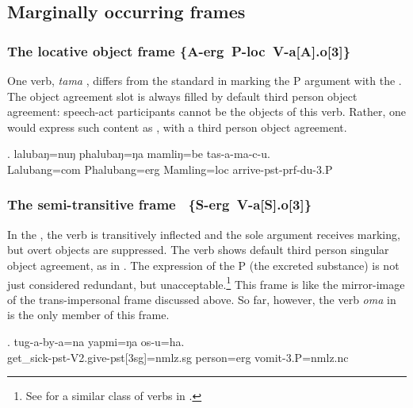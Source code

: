 \subsection{Marginally occurring frames}\label{tr-marg}
\subsubsection[The locative object frame]{The locative object frame %
\mbox{\{A-{\sc erg} P-{\sc loc} V-a[A].o[3]\}}}
\label{tr-loc}


\noindent
One verb,  \emph{tama} , differs from the standard  in  marking the P argument with the  .  The object agreement slot is always filled by default third person object agreement: speech-act participants cannot be the objects of this verb. Rather, one would express  such content as , with a third person object agreement.

\exg. lalubaŋ=nuŋ   phalubaŋ=ŋa   mamliŋ=be   tas-a-ma-c-u.\\
Lalubang{\sc =com} Phalubang{\sc =erg} Mamling{\sc =loc} arrive{\sc -pst-prf-du-3.P}\\
 
  
 

\subsubsection[The semi-transitive frame]{The semi-transitive frame%
\mbox{ \{S-{\sc erg} V-a[S].o[3]\}}}
\label{tr-semi}


\noindent
In the , the verb is transitively inflected and the sole argument receives  marking, but overt objects are suppres\-sed. The verb shows default third person singular object agreement, as in \Next. The expression of the P (the excreted substance) is not just considered redundant, but unacceptable.\footnote{See  \citet[1480]{Li2007Splitergativity} for a similar class of verbs in .} This frame is like the mirror-image of the trans-impersonal frame discussed above. So far, however, the verb \emph{oma}  in \Next is the only member of this frame.

\exg. tug-a-by-a=na yapmi=ŋa os-u=ha.\\
 get\_sick{\sc -pst-V2.give-pst[3sg]=nmlz.sg} person{\sc =erg} vomit{\sc -3.P=nmlz.nc}\\


